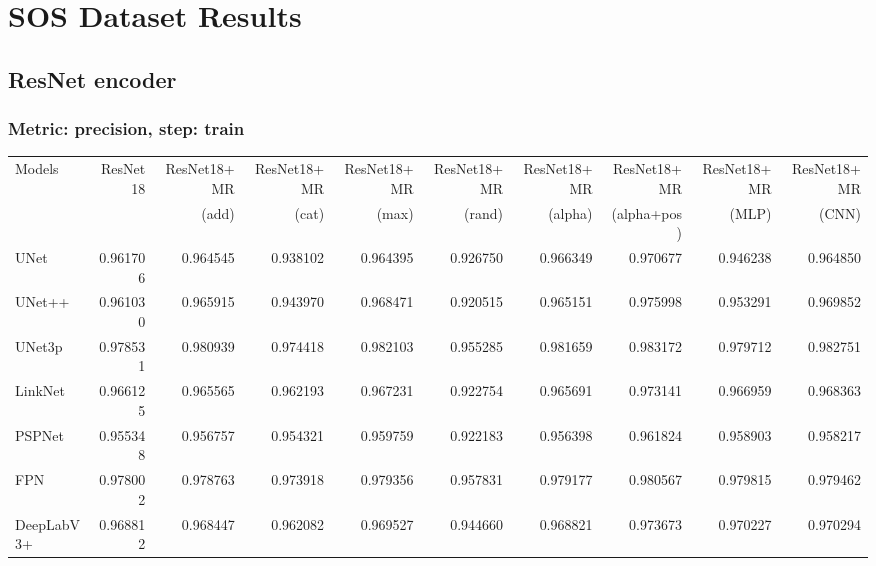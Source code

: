 \documentclass{article}
\begin{document}
\section{SOS Dataset Results}

\subsection{ResNet encoder}
\subsubsection{Metric: precision, step: train}
\begin{tabular}{lrrrrrrrrr}
\toprule
Models & ResNet18 & ResNet18+MR & ResNet18+MR & ResNet18+MR & ResNet18+MR & ResNet18+MR & ResNet18+MR & ResNet18+MR & ResNet18+MR \\
       &          &       (add) &       (cat) &       (max) &      (rand) &     (alpha) & (alpha+pos) &       (MLP) &       (CNN) \\
\midrule
UNet & 0.961706 & 0.964545 & 0.938102 & 0.964395 & 0.926750 & 0.966349 & 0.970677 & 0.946238 & 0.964850 \\
UNet++ & 0.961030 & 0.965915 & 0.943970 & 0.968471 & 0.920515 & 0.965151 & 0.975998 & 0.953291 & 0.969852 \\
UNet3p & 0.978531 & 0.980939 & 0.974418 & 0.982103 & 0.955285 & 0.981659 & 0.983172 & 0.979712 & 0.982751 \\
LinkNet & 0.966125 & 0.965565 & 0.962193 & 0.967231 & 0.922754 & 0.965691 & 0.973141 & 0.966959 & 0.968363 \\
PSPNet & 0.955348 & 0.956757 & 0.954321 & 0.959759 & 0.922183 & 0.956398 & 0.961824 & 0.958903 & 0.958217 \\
FPN & 0.978002 & 0.978763 & 0.973918 & 0.979356 & 0.957831 & 0.979177 & 0.980567 & 0.979815 & 0.979462 \\
DeepLabV3+ & 0.968812 & 0.968447 & 0.962082 & 0.969527 & 0.944660 & 0.968821 & 0.973673 & 0.970227 & 0.970294 \\
\bottomrule
\end{tabular}
\end{document}
